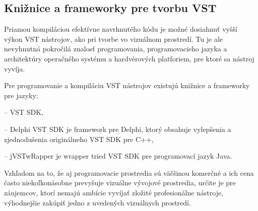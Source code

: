 \subsection{Knižnice a frameworky pre tvorbu VST}

Priamou kompiláciou efektívne navrhnutého kódu je možné dosiahnuť vyšší výkon VST nástrojov, ako pri tvorbe vo vizuálnom prostredí. Tu je ale nevyhnutná pokročilá znalosť programovania, programovacieho jazyka a architektúry operačného systému a hardvérových platforiem, pre ktoré sa nástroj vyvíja.

Pre programovanie a kompiláciu VST nástrojov existujú knižnice a frameworky pre jazyky:

\begin{description}
\setlength{\itemsep}{-0.5ex}
\item[C++] -- VST SDK,
\item[Delphi] -- Delphi VST SDK je framework pre Delphi, ktorý obsahuje vylepšenia a zjednodušenia originálneho VST SDK pre C++,
\item[Java] -- jVSTwRapper je wrapper tried VST SDK pre programovací jazyk Java.
\end{description}

Vzhľadom na to, že aj programovacie prostredia sú väčšinou komerčné a ich cena často niekoľkonásobne prevyšuje vizuálne vývojové prostredia, určite je pre záujemcov, ktorí nemajú ambície vyvíjať zložité profesionálne nástroje, výhodnejšie zakúpiť jedno z uvedených vizuálnych prostredí.